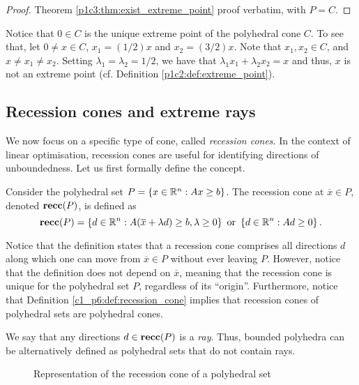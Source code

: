 \begin{proof}
	Theorem \ref{p1c3:thm:exist_extreme_point} proof verbatim, with $P = C$.	
\end{proof}

Notice that $0 \in C$ is the unique extreme point of the polyhedral cone $C$. To see that, let $0 \neq x \in C$, $x_1 = (1/2) x$ and $x_2 = (3/2)x$. Note that $x_1, x_2 \in C$, and $x \neq x_1 \neq x_2$. Setting $\lambda_1 = \lambda_2 = 1/2$, we have that $\lambda_1x_1  + \lambda_2x_2 = x$ and thus, $x$ is not an extreme point (cf. Definition \ref{p1c2:def:extreme_point}). 


\subsection{Recession cones and extreme rays}

We now focus on a specific type of cone, called \emph{recession cones}. In the context of linear optimisation, recession cones are useful for identifying directions of unboundedness. Let us first formally define the concept.

\begin{definition} \label{c1_p6:def:recession_cone}
	Consider the polyhedral set $P = \left\{ x \in \mathbb{R}^n : Ax \geq b \right \}$. The recession cone at $\overline{x} \in P$, denoted ${\bf recc}(P)$, is defined as
	\begin{equation*}
		{\bf recc}(P) = \left\{ d \in \mathbb{R}^n : A(\overline{x} + \lambda d) \geq b, \lambda \geq 0 \right \} \text{ or } \left\{ d \in \mathbb{R}^n : Ad \geq 0 \right \}. 	
	\end{equation*}
\end{definition}

Notice that the definition states that a recession cone comprises all directions $d$ along which one can move from $\overline{x} \in P$ without ever leaving $P$. However, notice that the definition does not depend on $\overline{x}$, meaning that the recession cone is unique for the polyhedral set $P$, regardless of its ``origin''. Furthermore, notice that Definition \ref{c1_p6:def:recession_cone} implies that recession cones of polyhedral sets are polyhedral cones. 

We say that any directions $d \in {\bf recc}(P)$ is a \emph{ray}. Thus, bounded polyhedra can be alternatively defined as polyhedral sets that do not contain rays. 

\begin{figure}[h]
	\caption{Representation of the recession cone of a polyhedral set} \label{p1c6:fig:recession_cone}	
\end{figure}


